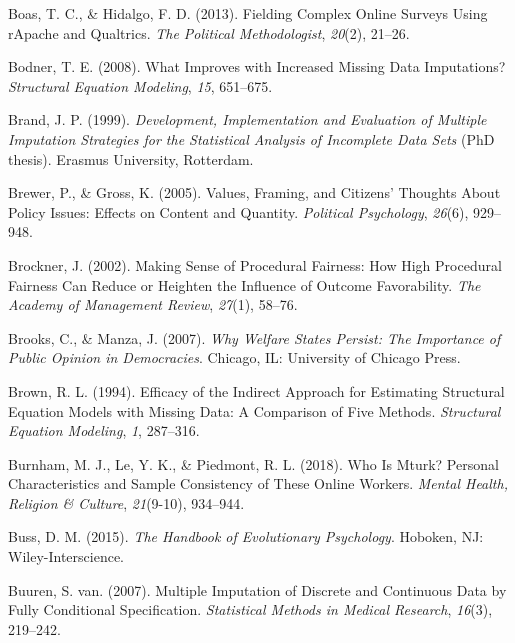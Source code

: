 \documentclass[12pt,econ]{sources/authesis}
\newenvironment{CSLReferences}%
  {}%
  {\par}
\begin{document}
\begin{CSLReferences}{1}{0}
\leavevmode{}%
Boas, T. C., \& Hidalgo, F. D. (2013). Fielding {Complex} {Online} {Surveys} {Using} {rApache} and {Qualtrics}. \emph{The Political Methodologist}, \emph{20}(2), 21--26.

\leavevmode{}%
Bodner, T. E. (2008). {What Improves with Increased Missing Data Imputations?} \emph{Structural Equation Modeling}, \emph{15}, 651--675.

\leavevmode{}%
Brand, J. P. (1999). \emph{{Development, Implementation and Evaluation of Multiple Imputation Strategies for the Statistical Analysis of Incomplete Data Sets}} (PhD thesis). Erasmus University, Rotterdam.

\leavevmode{}%
Brewer, P., \& Gross, K. (2005). Values, {Framing}, and {Citizens}' {Thoughts} {About} {Policy} {Issues}: {Effects} on {Content} and {Quantity}. \emph{Political Psychology}, \emph{26}(6), 929--948.

\leavevmode{}%
Brockner, J. (2002). {Making Sense of Procedural Fairness: How High Procedural Fairness Can Reduce or Heighten the Influence of Outcome Favorability}. \emph{The Academy of Management Review}, \emph{27}(1), 58--76.

\leavevmode{}%
Brooks, C., \& Manza, J. (2007). \emph{{Why Welfare States Persist: The Importance of Public Opinion in Democracies}}. Chicago, IL: University of Chicago Press.

\leavevmode{}%
Brown, R. L. (1994). {Efficacy of the Indirect Approach for Estimating Structural Equation Models with Missing Data: A Comparison of Five Methods}. \emph{Structural Equation Modeling}, \emph{1}, 287--316.

\leavevmode{}%
Burnham, M. J., Le, Y. K., \& Piedmont, R. L. (2018). {Who Is Mturk? Personal Characteristics and Sample Consistency of These Online Workers}. \emph{Mental Health, Religion \& Culture}, \emph{21}(9-10), 934--944.

\leavevmode{}%
Buss, D. M. (2015). \emph{{The Handbook of Evolutionary Psychology}}. Hoboken, NJ: Wiley-Interscience.

\leavevmode{}%
Buuren, S. van. (2007). {Multiple Imputation of Discrete and Continuous Data by Fully Conditional Specification}. \emph{Statistical Methods in Medical Research}, \emph{16}(3), 219--242.


\end{CSLReferences}
\end{document}
